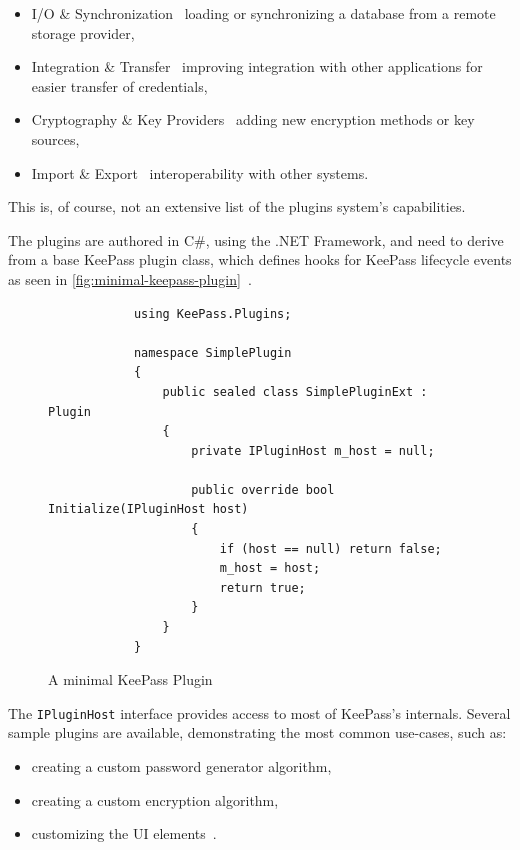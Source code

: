 \begin{itemize}
	\item I/O \& Synchronization \textendash\ loading or synchronizing a database from a remote storage provider,
	\item Integration \& Transfer \textendash\ improving integration with other applications for easier transfer of credentials,
	\item Cryptography \& Key Providers \textendash\ adding new encryption methods or key sources,
	\item Import \& Export \textendash\ interoperability with other systems.
\end{itemize}

This is, of course, not an extensive list of the plugins system's capabilities.

The plugins are authored in C\#, using the .NET Framework, and need to derive from a base KeePass plugin class,
which defines hooks for KeePass lifecycle events as seen in \autoref{fig:minimal-keepass-plugin}~\cite{keepass:plugin-development}.

\begin{figure}[H]
	\begin{minipage}[]{\linewidth}
		\begin{verbatim}
			using KeePass.Plugins;

			namespace SimplePlugin
			{
				public sealed class SimplePluginExt : Plugin
				{
					private IPluginHost m_host = null;

					public override bool Initialize(IPluginHost host)
					{
						if (host == null) return false;
						m_host = host;
						return true;
					}
				}
			}
		\end{verbatim}
	\end{minipage}

	\caption[A minimal KeePass plugin]
	{A minimal KeePass Plugin~\protect\cite{keepass:plugin-development}}
	\label{fig:minimal-keepass-plugin}
\end{figure}

The \texttt{IPluginHost} interface provides access to most of KeePass's internals. Several sample plugins
are available, demonstrating the most common use-cases, such as:

\begin{itemize}
	\item creating a custom password generator algorithm,
	\item creating a custom encryption algorithm,
	\item customizing the UI elements~\cite{keepass:plugins}.
\end{itemize}

